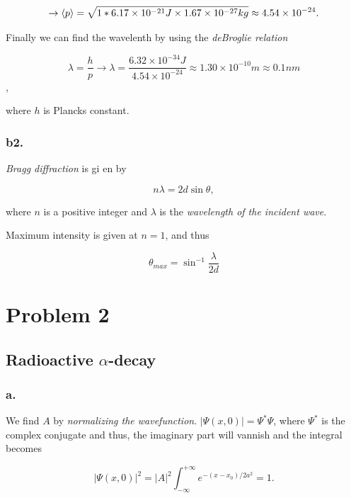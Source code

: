 \documentclass{article}
\begin{document}
\begin{equation}
\rightarrow \braket{p} = \sqrt{1*6.17\times 10^{-21}J\times 1.67\times 10^{-27}kg} \approx 4.54\times 10^{-24}.
\end{equation}

Finally we can find the wavelenth by using the \textit{deBroglie relation} 

\begin{equation}
\lambda = \frac{h}{p} \rightarrow \lambda = \frac{6.32\times 10^{-34}J}{4.54\times 10^{-24}} \approx 1.30\times 10^{-10}m \approx 0.1nm
\end{equation},

where $h$ is Plancks constant.

\subsubsection*{b2.}

\textit{Bragg diffraction} is gi en by

\begin{equation}
n\lambda = 2d\sin{\theta},
\end{equation}

where $n$ is a positive integer and $\lambda$ is the \textit{wavelength of the incident wave}.

Maximum intensity is given at $n=1$, and thus

\begin{equation}
\theta_{max} = \sin^{-1}{\frac{\lambda}{2d}}
\end{equation}

\section*{Problem 2}

\subsection*{Radioactive $\alpha$-decay}

\subsubsection*{a.}

We find $A$ by \textit{normalizing the wavefunction}. $|\Psi(x, 0)| = \Psi^*\Psi$, where $\Psi^*$ is the complex conjugate and thus, the imaginary part will vannish and the integral becomes

\begin{equation}
|\Psi(x, 0)|^2 = |A|^2\int_{-\infty}^{+\infty}e^{-(x-x_0)/2a^2} = 1.
\end{equation}
\end{document}
